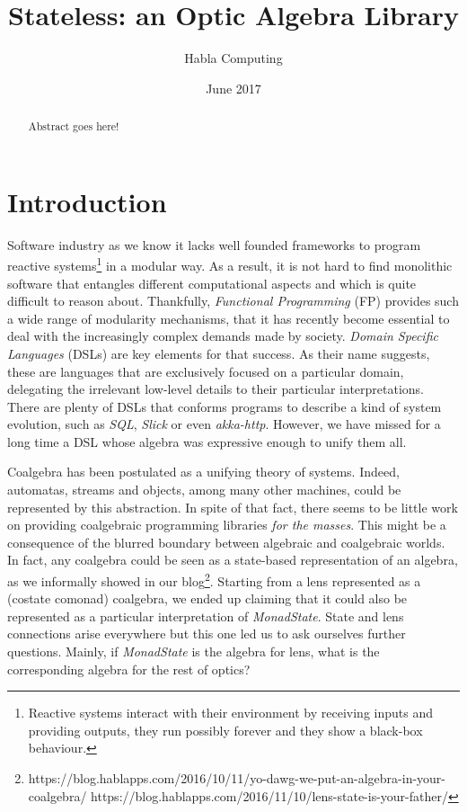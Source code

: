 \documentclass[a4paper]{report}
\begin{document}
\title{Stateless: an Optic Algebra Library}
\author{Habla Computing}
\date{June 2017}

\maketitle

\begin{abstract}

  Abstract goes here!

\end{abstract}

\tableofcontents

\chapter{Introduction}

Software industry as we know it lacks well founded frameworks to program
reactive systems\footnote{Reactive systems interact with their environment by
receiving inputs and providing outputs, they run possibly forever and they show
a black-box behaviour.} in a modular way. As a result, it is not hard to find
monolithic software that entangles different computational aspects and which is
quite difficult to reason about. Thankfully, \emph{Functional Programming} (FP)
provides such a wide range of modularity mechanisms, that it has recently become
essential to deal with the increasingly complex demands made by society.
\emph{Domain Specific Languages} (DSLs) are key elements for that success. As
their name suggests, these are languages that are exclusively focused on a
particular domain, delegating the irrelevant low-level details to their
particular interpretations. There are plenty of DSLs that conforms programs to
describe a kind of system evolution, such as \emph{SQL}, \emph{Slick} or even
\emph{akka-http}. However, we have missed for a long time a DSL whose algebra
was expressive enough to unify them all.

Coalgebra has been postulated as a unifying theory of systems. Indeed,
automatas, streams and objects, among many other machines, could be represented
by this abstraction. In spite of that fact, there seems to be little work on
providing coalgebraic programming libraries \emph{for the masses}. This might be
a consequence of the blurred boundary between algebraic and coalgebraic worlds.
In fact, any coalgebra could be seen as a state-based representation of an
algebra, as we informally showed in our blog\footnote{
https://blog.hablapps.com/2016/10/11/yo-dawg-we-put-an-algebra-in-your-coalgebra/
https://blog.hablapps.com/2016/11/10/lens-state-is-your-father/}. Starting from
a lens represented as a (costate comonad) coalgebra, we ended up claiming that
it could also be represented as a particular interpretation of
\emph{MonadState}. State and lens connections arise everywhere but this one led
us to ask ourselves further questions. Mainly, if \emph{MonadState} is the
algebra for lens, what is the corresponding algebra for the rest of optics?
\end{document}
